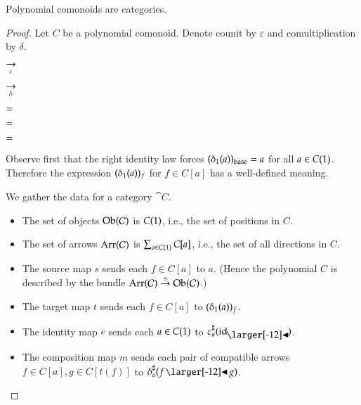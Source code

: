 \documentclass{amsart}
\begin{document}
\begin{prop}
  Polynomial comonoids are categories.
\end{prop}
\begin{proof}
  Let $C$ be a polynomial comonoid. Denote counit by $\varepsilon$
  and comultiplication by $\delta$.
  
  \begin{center}
    
    \hspace{-.75em}
    $\underset{\varepsilon}{\to}$
    
    \quad\qquad
    
    \hspace{-.75em}
    $\underset{\delta}{\to}$
    \hspace{.5em}
    
  \end{center}

  \begin{center}
    
    \quad
    $=$
    
    $=$
    \quad
    
  \end{center}

  \begin{center}
    
    \quad
    $=$
    \quad
    
  \end{center}

  Observe first that the right identity law forces $({\delta}_1(a))_{\mathrm{base}} = a$
  for all $a \in C(1)$.
  Therefore the expression $({\delta}_1(a))_f$ for $f \in C[a]$ has a
  well-defined meaning.

  We gather the data for a category $\cat{C}$.
  \begin{itemize}
  \item The set of objects $\operatorname{Ob}(\mathcal{C})$ is $C(1)$, i.e., the set
    of positions in $C$.
  \item The set of arrows $\operatorname{Arr}(\mathcal{C})$ is
    $\sum_{a \in C(1)}C[a]$, i.e., the set of all directions in $C$.
  \item The source map $s$ sends each $f \in C[a]$ to $a$. (Hence the
    polynomial $C$ is described by the bundle
    $\operatorname{Arr}(\mathcal{C}) \overset{s}{\to} \operatorname{Ob}(\mathcal{C})$.)
  \item The target map $t$ sends each $f \in C[a]$ to $({\delta}_1(a))_f$.
  \item The identity map $e$ sends each $a \in C(1)$ to
    $\dirmap{\varepsilon}{a}{\idsubd}$.
  \item The composition map $m$ sends each pair of compatible
    arrows ${f \in C[a]}, {g \in C[t(f)]}$ to $\dirmap{\delta}{a}{f \subd g}$.
  \end{itemize}


\end{proof}
\end{document}
